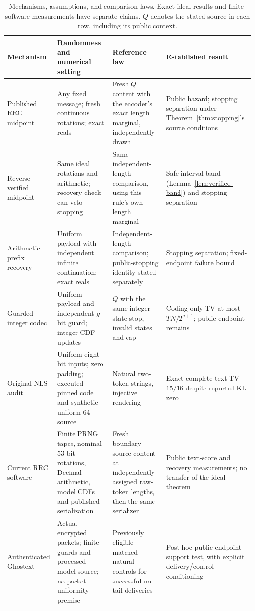 \begin{table}[t]
\centering
\caption{Mechanisms, assumptions, and comparison laws. Exact ideal results and
finite-software measurements have separate claims. $Q$ denotes the stated
source in each row, including its public context.}
\label{tab:mechanism-scope}
\small
\begin{tabularx}{\textwidth}{>{\raggedright\arraybackslash}p{}>{\raggedright\arraybackslash}p{}>{\raggedright\arraybackslash}p{}>{\raggedright\arraybackslash}X}
\toprule
Mechanism & Randomness and numerical setting & Reference law & Established result \\
\midrule
Published RRC midpoint &
Any fixed message; fresh continuous rotations; exact reals &
Fresh $Q$ content with the encoder's exact length marginal, independently drawn &
Public hazard; stopping separation under Theorem~\ref{thm:stopping}'s source conditions \\
Reverse-verified midpoint &
Same ideal rotations and arithmetic; recovery check can veto stopping &
Same independent-length comparison, using this rule's own length marginal &
Safe-interval band (Lemma~\ref{lem:verified-band}) and stopping separation \\
Arithmetic-prefix recovery &
Uniform payload with independent infinite continuation; exact reals &
Independent-length comparison; public-stopping identity stated separately &
Stopping separation; fixed-endpoint failure bound \\
Guarded integer codec &
Uniform payload and independent $g$-bit guard; integer CDF updates &
$Q$ with the same integer-state stop, invalid states, and cap &
Coding-only TV at most $TN/2^{g+1}$; public endpoint remains \\
Original NLS audit &
Uniform eight-bit inputs; zero padding; executed pinned code and synthetic uniform-64 source &
Natural two-token strings, injective rendering &
Exact complete-text TV $15/16$ despite reported KL zero \\
Current RRC software &
Finite PRNG tapes, nominal 53-bit rotations, Decimal arithmetic, model CDFs and published serialization &
Fresh boundary-source content at independently assigned raw-token lengths, then the same serializer &
Public text-score and recovery measurements; no transfer of the ideal theorem \\
Authenticated Ghostext &
Actual encrypted packets; finite guards and processed model source; no packet-uniformity premise &
Previously eligible matched natural controls for successful no-tail deliveries &
Post-hoc public endpoint support test, with explicit delivery/control conditioning \\
\bottomrule
\end{tabularx}
\end{table}
